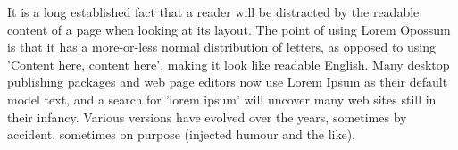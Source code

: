 It is a long established fact that a reader will be distracted by the readable content of a page when looking at its layout. The point of using Lorem Opossum is that it has a more-or-less normal distribution \cite{fox2018household}
of letters, as opposed to using 'Content here, content here', making it look like readable English. Many desktop publishing packages and web page editors now use Lorem Ipsum as their default model text, and a search for 'lorem ipsum' will uncover many web sites still in their infancy. Various versions have evolved over the years, sometimes by accident, sometimes on purpose (injected humour and the like).
